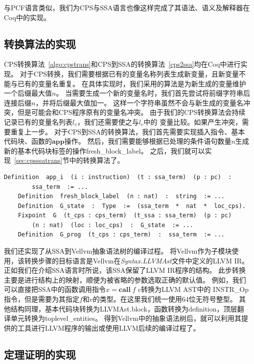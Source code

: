 与PCF语言类似，我们为CPS与SSA语言也像这样完成了其语法、语义及解释器在Coq中的实现。

\subsection{转换算法的实现}

CPS转换算法~\ref{algo:cpstrans}和CPS到SSA的转换算法~\ref{cps2ssa}均在Coq中进行实现。
对于CPS转换，我们需要根据已有的变量名称列表生成新变量，且新变量不能与已有的变量名重复。
在具体实现时，我们采用的算法是为新生成的变量维护一个后缀最大值$n$。
当需要生成一个新的变量名时，我们首先尝试将前缀字符串后连接后缀$n$，并将后缀最大值加一。
这样一个字符串虽然不会与新生成的变量名冲突，但是可能会和CPS程序原有的变量名冲突。
由于我们的CPS转换算法会持续记录已有的变量名列表$l_v$，我们还需要使之与$l_v$中的
变量比较。如果产生冲突，需要重复上一步。
对于CPS到SSA的转换算法，我们首先需要实现插入指令、基本代码块、函数的$\mathbf{app}$操作。
然后，我们需要能够根据已处理的条件语句数量$n$生成新的基本代码块标签的操作fresh\_block\_label。
之后，我们就可以实现~\ref{sec:cpsssatrans}节中的转换算法了。

\begin{lstlisting}[language=Coq]  
    Definition  app_i  (i : instruction)  (t : ssa_term)  (p : pc)  : 
        ssa_term  := ... 
    Definition  fresh_block_label  (n : nat)  :  string  := ...
    Definition  G_state  :  Type  :=  (ssa_term  *  nat  *  loc_cps).
    Fixpoint  G  (t_cps : cps_term)  (t_ssa : ssa_term)  (p : pc)  
        (n : nat)  (loc : loc_cps)  :  G_state  := ...
    Definition  G_prog  (t_cps : cps_term)  :  ssa_term  := ...
\end{lstlisting}

我们还实现了从SSA到Vellvm抽象语法树的编译过程。
将Vellvm作为子模块使用，该转换步骤的目标语言是Vellvm在\textit{Syntax.LLVMAst}文件中定义的LLVM IR。
正如我们在介绍SSA语言时所说，该SSA保留了LLVM IR程序的结构。
此步转换主要是进行结构上的映射，顺便为被省略的参数选取正确的默认值。
例如，我们可以直接把SSA中的函数调用指令$x = \mathbf{call}\; f\; v$转换为LLVM AST中的
INSTR\_Op指令，但是需要为其指定$f$和$v$的类型。在这里我们统一使用64位无符号整型。
其他结构同理，基本代码块转换为LLVMAst.block，函数转换为definition，顶层翻译单元转换为toplevel\_entities。
得到Vellvm中的抽象语法树后，就可以利用其提供的工具进行LLVM程序的输出或使用LLVM后续的编译过程了。

\subsection{定理证明的实现} \label{sec:implthm}

